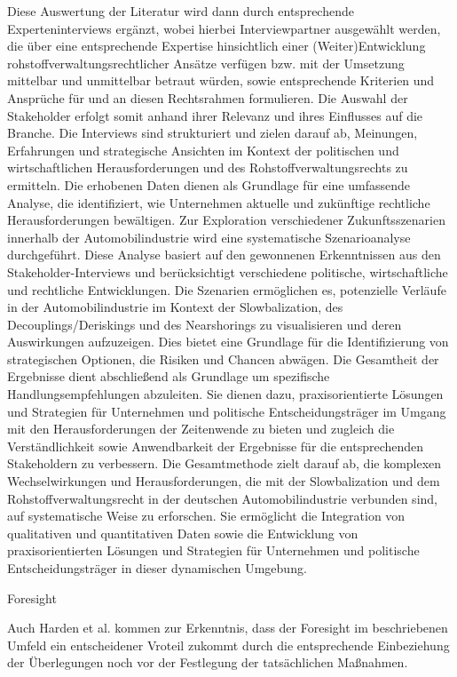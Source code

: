 \documentclass[12pt,a4paper,oneside]{book} %
\begin{document}
Diese Auswertung der Literatur wird dann durch entsprechende Experteninterviews ergänzt, wobei hierbei Interviewpartner ausgewählt werden, die über eine entsprechende Expertise hinsichtlich einer (Weiter)Entwicklung rohstoffverwaltungsrechtlicher Ansätze verfügen bzw. mit der Umsetzung mittelbar und unmittelbar betraut würden, sowie entsprechende Kriterien und Ansprüche für und an diesen Rechtsrahmen formulieren. Die Auswahl der Stakeholder erfolgt somit anhand ihrer Relevanz und ihres Einflusses auf die Branche. Die Interviews sind strukturiert und zielen darauf ab, Meinungen, Erfahrungen und strategische Ansichten im Kontext der politischen und wirtschaftlichen Herausforderungen und des Rohstoffverwaltungsrechts zu ermitteln. Die erhobenen Daten dienen als Grundlage für eine umfassende Analyse, die identifiziert, wie Unternehmen aktuelle und zukünftige rechtliche Herausforderungen bewältigen. Zur Exploration verschiedener Zukunftsszenarien innerhalb der Automobilindustrie wird eine systematische Szenarioanalyse durchgeführt. Diese Analyse basiert auf den gewonnenen Erkenntnissen aus den Stakeholder-Interviews und berücksichtigt verschiedene politische, wirtschaftliche und rechtliche Entwicklungen. Die Szenarien ermöglichen es, potenzielle Verläufe in der Automobilindustrie im Kontext der Slowbalization, des Decouplings/Deriskings und des Nearshorings zu visualisieren und deren Auswirkungen aufzuzeigen. Dies bietet eine Grundlage für die Identifizierung von strategischen Optionen, die Risiken und Chancen abwägen. Die Gesamtheit der Ergebnisse dient abschließend als Grundlage um spezifische Handlungsempfehlungen abzuleiten. Sie dienen dazu, praxisorientierte Lösungen und Strategien für Unternehmen und politische Entscheidungsträger im Umgang mit den Herausforderungen der Zeitenwende zu bieten und zugleich die Verständlichkeit sowie Anwendbarkeit der Ergebnisse für die entsprechenden Stakeholdern zu verbessern.
Die Gesamtmethode zielt darauf ab, die komplexen Wechselwirkungen und Herausforderungen, die mit der Slowbalization und dem Rohstoffverwaltungsrecht in der deutschen Automobilindustrie verbunden sind, auf systematische Weise zu erforschen. Sie ermöglicht die Integration von qualitativen und quantitativen Daten sowie die Entwicklung von praxisorientierten Lösungen und Strategien für Unternehmen und politische Entscheidungsträger in dieser dynamischen Umgebung.

Foresight

Auch Harden et al. kommen zur Erkenntnis, dass der Foresight im beschriebenen Umfeld ein entscheidener Vroteil zukommt durch die entsprechende Einbeziehung der Überlegungen noch vor der Festlegung der tatsächlichen Maßnahmen.\autocite{Trade policy and the 2026 redesign of critical mineral supply chains}
\end{document}

